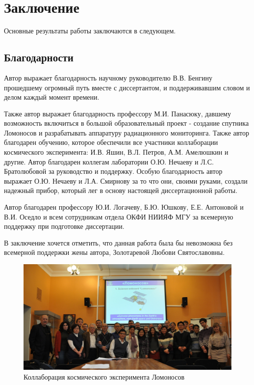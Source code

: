 \chapter*{Заключение}						%


Основные результаты работы заключаются в следующем.

\section{Благодарности}
Автор выражает благодарность научному руководителю В.В. Бенгину  прошедшему огромный путь вместе с диссертантом, и поддерживавшим словом и делом каждый момент времени. 

Также автор выражает благодарность профессору М.И. Панасюку, давшему возможность включиться в большой образовательный проект - создание спутника Ломоносов и разрабатывать аппаратуру радиационного мониторинга. Также автор благодарен обучению, которое обеспечили  все участники коллаборации космического эксперимента:  И.В. Яшин,  В.Л. Петров,  А.М. Амелюшкин и другие.  Автор благодарен коллегам  лаборатории  О.Ю. Нечаеву и  Л.С. Братолюбовой за руководство и поддержку. Особую благодарность автор выражает  О.Ю. Нечаеву и  Л.А. Смирнову за то что они,  своими руками, создали надежный прибор, который лег в основу настоящей диссертационной работы.

Автор благодарен  профессору Ю.И. Логачеву,  Б.Ю. Юшкову, Е.Е. Антоновой и  В.И. Оседло и всем сотрудникам отдела ОКФИ НИИЯФ МГУ за всемерную поддержку при подготовке диссертации.  

В заключение хочется отметить, что данная работа была бы невозможна без всемерной поддержки жены автора, Золотаревой Любови Святославовны.

\begin{figure}
	\centering
	\includegraphics[width=0.7\linewidth]{images/collab}
	\caption{Коллаборация космического эксперимента Ломоносов}
	\label{fig:collab}
\end{figure}
